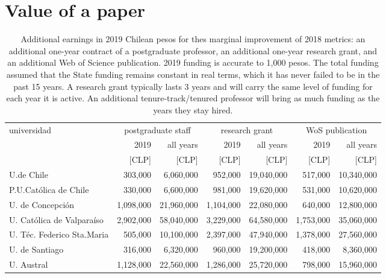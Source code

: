 \documentclass[twocolumn]{article}
\begin{document}
\section{Value of a paper}
\begin{table}
\centering
\caption{Additional earnings in 2019 Chilean pesos for thes marginal improvement of 2018 metrics: an additional one-year contract of a postgraduate professor, an additional one-year research grant, and an additional Web of Science publication.  2019 funding is accurate to 1,000 pesos. The total funding assumed that the State funding remains constant in real terms, which it has never failed to be in the past 15 years.  A research grant typically lasts 3 years and will carry the same level of funding for each year it is active.  An additional tenure-track/tenured professor will bring as much funding as the years they stay hired.}
\label{tab:sciencecost}
\begin{tabular}{l rr rr rr}
\hline\hline
universidad                    & \multicolumn{2}{c}{postgraduate staff} & \multicolumn{2}{c}{research grant} & \multicolumn{2}{c}{WoS publication} \\
                               & 2019        & all years     & 2019        & all years     & 2019        & all years     \\
                               & [CLP]       & [CLP]         & [CLP]       & [CLP]         & [CLP]       & [CLP]         \\
\hline
U.de Chile                     &     303,000 &     6,060,000 &     952,000 &    19,040,000 &     517,000 &    10,340,000 \\
P.U.Católica de Chile          &     330,000 &     6,600,000 &     981,000 &    19,620,000 &     531,000 &    10,620,000 \\
U. de Concepción               &   1,098,000 &    21,960,000 &   1,104,000 &    22,080,000 &     640,000 &    12,800,000 \\
U. Católica de Valparaíso      &   2,902,000 &    58,040,000 &   3,229,000 &    64,580,000 &   1,753,000 &    35,060,000 \\
U. Téc. Federico Sta.Maria     &     505,000 &    10,100,000 &   2,397,000 &    47,940,000 &   1,378,000 &    27,560,000 \\
U. de Santiago                 &     316,000 &     6,320,000 &     960,000 &    19,200,000 &     418,000 &     8,360,000 \\
U. Austral                     &   1,128,000 &    22,560,000 &   1,286,000 &    25,720,000 &     798,000 &    15,960,000 \\

\end{tabular}
\end{table}
\end{document}
